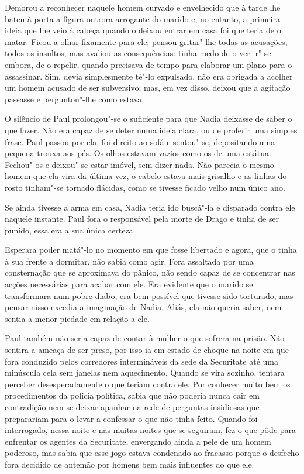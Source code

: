 Demorou a reconhecer naquele homem curvado e envelhecido que à tarde
lhe bateu à porta a figura outrora arrogante do marido e, no entanto, a
primeira ideia que lhe veio à cabeça quando o deixou entrar em casa foi
que teria de o matar. Ficou a olhar fixamente para ele; pensou
gritar"-lhe todas as acusações, todos os insultos, mas avaliou as
consequências: tinha medo de o ver ir"-se embora, de o repelir, quando
precisava de tempo para elaborar um plano para o assassinar. Sim, devia
simplesmente tê"-lo expulsado, não era obrigada a acolher um homem
acusado de ser subversivo; mas, em vez disso, deixou que a agitação
passasse e perguntou"-lhe como estava.

O silêncio de Paul prolongou"-se o suficiente para que Nadia deixasse de
saber o que fazer. Não era capaz de se deter numa ideia clara, ou de
proferir uma simples frase. Paul passou por ela, foi direito ao sofá e
sentou"-se, depositando uma pequena trouxa aos pés. Os olhos estavam
vazios como os de uma estátua. Fechou"-os e deixou"-se estar imóvel, sem
dizer nada. Não parecia o mesmo homem que ela vira da última vez, o
cabelo estava mais grisalho e as linhas do rosto tinham"-se tornado
flácidas, como se tivesse ficado velho num único ano.

Se ainda tivesse a arma em casa, Nadia teria ido buscá"-la e disparado contra ele naquele instante. Paul fora o responsável
pela morte de Drago e tinha de ser punido, essa era a sua única certeza.

Esperara poder matá"-lo no momento em que fosse libertado e agora, que o
tinha à sua frente a dormitar, não sabia como agir. Fora assaltada por
uma consternação que se aproximava do pânico, não sendo capaz de se
concentrar nas acções necessárias para acabar com ele. Era evidente
que o marido se transformara num pobre diabo, era bem possível que
tivesse sido torturado, mas pensar nisso excedia a imaginação de Nadia.
Aliás, ela não queria saber, nem sentia a menor piedade em relação a
ele.

\bigskip

Paul também não seria capaz de contar à mulher o que sofrera na prisão.
Não sentira a ameaça de ser preso, por isso ia em estado de choque na
noite em que fora conduzido pelos corredores intermináveis da sede da
Securitate até uma minúscula cela sem janelas nem aquecimento. Quando se
vira sozinho, tentara perceber desesperadamente o que teriam contra ele. Por conhecer muito bem os procedimentos
da polícia política, sabia que não poderia nunca cair em contradição nem
se deixar apanhar na rede de perguntas insidiosas que preparariam para o
levar a confessar o que não tinha feito. Quando foi interrogado, nessa
noite e nas muitas noites que se seguiram, fez o que pôde para enfrentar
os agentes da Securitate, envergando ainda a pele de um homem poderoso,
mas sabia que esse jogo estava condenado ao fracasso porque o desfecho
fora decidido de antemão por homens bem mais influentes do que ele.

